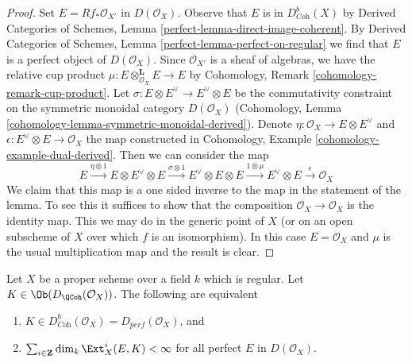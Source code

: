 \begin{proof}
Set $E = Rf_*\mathcal{O}_{X'}$ in $D(\mathcal{O}_X)$.
Observe that $E$ is in $D^b_{\textit{Coh}}(X)$ by
Derived Categories of Schemes, Lemma \ref{perfect-lemma-direct-image-coherent}.
By 
Derived Categories of Schemes, Lemma \ref{perfect-lemma-perfect-on-regular}
we find that $E$ is a perfect object of $D(\mathcal{O}_X)$.
Since $\mathcal{O}_{X'}$ is a sheaf of algebras, we have the
relative cup product $\mu : E \otimes_{\mathcal{O}_X}^\mathbf{L} E \to E$
by Cohomology, Remark \ref{cohomology-remark-cup-product}.
Let $\sigma : E \otimes E^\vee \to E^\vee \otimes E$ be the commutativity
constraint on the symmetric monoidal category $D(\mathcal{O}_X)$
(Cohomology, Lemma \ref{cohomology-lemma-symmetric-monoidal-derived}).
Denote $\eta : \mathcal{O}_X \to E \otimes E^\vee$ and
$\epsilon : E^\vee \otimes E \to \mathcal{O}_X$ the map
constructed in Cohomology, Example \ref{cohomology-example-dual-derived}.
Then we can consider the map
$$
E \xrightarrow{\eta \otimes 1} E \otimes E^\vee \otimes E
\xrightarrow{\sigma \otimes 1} E^\vee \otimes E \otimes E
\xrightarrow{1 \otimes \mu} E^\vee \otimes E
\xrightarrow{\epsilon} \mathcal{O}_X
$$
We claim that this map is a one sided inverse to the map in the
statement of the lemma. To see this it suffices to show that
the composition $\mathcal{O}_X \to \mathcal{O}_X$ is the identity
map. This we may do in the generic point of $X$ (or on an open
subscheme of $X$ over which $f$ is an isomorphism). In this
case $E = \mathcal{O}_X$ and $\mu$ is the usual multiplication map
and the result is clear.
\end{proof}

\begin{lemma}
\label{lemma-characterize-dbcoh-proper-regular}
Let $X$ be a proper scheme over a field $k$ which is regular. Let
$K \in \Ob(D_\QCoh(\mathcal{O}_X))$. The following are equivalent
\begin{enumerate}
\item $K \in D^b_{\textit{Coh}}(\mathcal{O}_X) = D_{perf}(\mathcal{O}_X)$, and
\item $\sum_{i \in \mathbf{Z}} \dim_k \Ext^i_X(E, K) < \infty$
for all perfect $E$ in $D(\mathcal{O}_X)$.
\end{enumerate}
\end{lemma}

